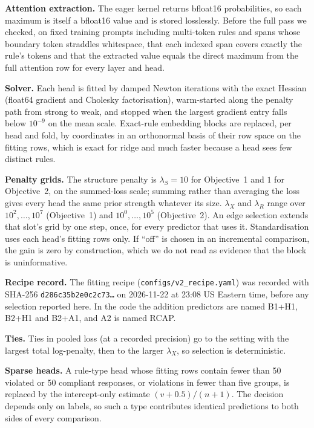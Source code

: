 \documentclass{article}
\begin{document}
\textbf{Attention extraction.} The eager kernel returns bfloat16 probabilities, so each maximum is itself a bfloat16
value and is stored losslessly. Before the full pass we checked, on fixed training prompts including multi-token rules
and spans whose boundary token straddles whitespace, that each indexed span covers exactly the rule's tokens and that
the extracted value equals the direct maximum from the full attention row for every layer and head.

\textbf{Solver.} Each head is fitted by damped Newton iterations with the exact Hessian (float64 gradient and Cholesky
factorisation), warm-started along the penalty path from strong to weak, and stopped when the largest gradient entry
falls below $10^{-9}$ on the mean scale. Exact-rule embedding blocks are replaced, per head and fold, by coordinates in
an orthonormal basis of their row space on the fitting rows, which is exact for ridge and much faster because a head
sees few distinct rules.

\textbf{Penalty grids.} The structure penalty is $\lambda_S=10$ for Objective~1 and $1$ for Objective~2, on the
summed-loss scale; summing rather than averaging the loss gives every head the same prior strength whatever its size.
$\lambda_X$ and $\lambda_R$ range over $10^2,\dots,10^7$ (Objective~1) and $10^0,\dots,10^5$ (Objective~2). An edge
selection extends that slot's grid by one step, once, for every predictor that uses it. Standardisation uses each
head's fitting rows only. If ``off'' is chosen in an incremental comparison, the gain is zero by construction, which we
do not read as evidence that the block is uninformative.

\textbf{Recipe record.} The fitting recipe (\texttt{configs/v2\_recipe.yaml}) was recorded with SHA-256
\texttt{d286c35b2e0c2c73\ldots} on 2026-11-22 at 23:08 US Eastern time, before any selection reported here. In the
code the addition predictors are named B1+H1, B2+H1 and B2+A1, and A2 is named RCAP.

\textbf{Ties.} Ties in pooled loss (at a recorded precision) go to the setting with the largest total log-penalty, then
to the larger $\lambda_X$, so selection is deterministic.

\textbf{Sparse heads.} A rule-type head whose fitting rows contain fewer than 50 violated or 50 compliant responses, or
violations in fewer than five groups, is replaced by the intercept-only estimate $(v+0.5)/(n+1)$. The decision depends
only on labels, so such a type contributes identical predictions to both sides of every comparison.
\end{document}
